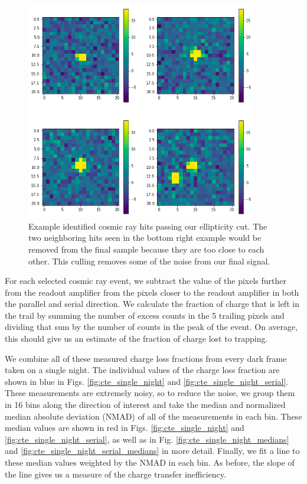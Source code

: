 \begin{figure}
    \centering
    \includegraphics[width=0.9\textwidth]{figures/cte/example_hits.png}
    \caption{Example identified cosmic ray hits passing our ellipticity cut. The two neighboring hits seen in the bottom right example would be removed from the final sample because they are too close to each other. This culling removes some of the noise from our final signal.}
    \label{fig:example_hits}
\end{figure}

For each selected cosmic ray event, we subtract the value of the pixels further from the readout amplifier from the pixels closer to the readout amplifier in both the parallel and serial direction. We calculate the fraction of charge that is left in the trail by summing the number of excess counts in the 5 trailing pixels and dividing that sum by the number of counts in the peak of the event. On average, this should give us an estimate of the fraction of charge lost to trapping. 
    
We combine all of these measured charge loss fractions from every dark frame taken on a single night. The individual values of the charge loss fraction are shown in blue in Figs. \ref{fig:cte_single_night} and \ref{fig:cte_single_night_serial}. These measurements are extremely noisy, so to reduce the noise, we group them in 16 bins along the direction of interest and take the median and normalized median absolute deviation (NMAD) of all of the measurements in each bin. These median values are shown in red in Figs. \ref{fig:cte_single_night} and \ref{fig:cte_single_night_serial}, as well as in Fig. \ref{fig:cte_single_night_medians} and \ref{fig:cte_single_night_serial_medians} in more detail. Finally, we fit a line to these median values weighted by the NMAD in each bin. As before, the slope of the line gives us a measure of the charge transfer inefficiency.

